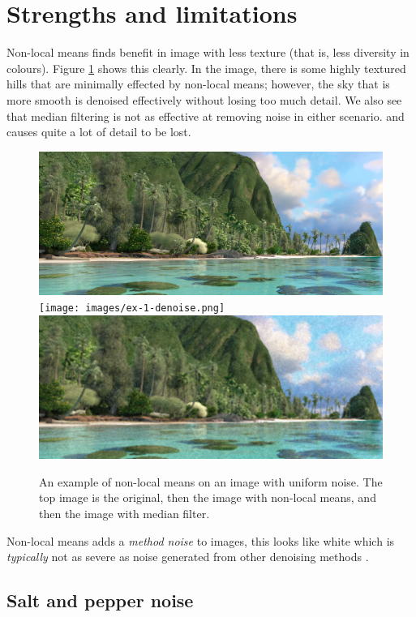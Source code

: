 \section{Strengths and limitations}

Non-local means finds benefit in image with less texture
(that is, less diversity in colours).
Figure \ref{fig:ex-1} shows this clearly.
In the image, 
there is some highly textured hills that are minimally effected by
non-local means; however,
the sky that is more smooth is denoised effectively without losing too much detail.
We also see that median filtering is not as effective at removing noise in 
either scenario. and causes quite a lot of detail to be lost.

\begin{figure}
    \centering
    \includegraphics[width=0.7\linewidth]{images/ex-1-original.jpg}
    \texttt{[image: images/ex-1-denoise.png]}
    \includegraphics[width=0.7\linewidth]{images/ex-1-median.png}
    \caption{An example of non-local means on an image with uniform noise.
             The top image is the original, 
             then the image with non-local means, 
             and then the image with median filter.}
    \label{fig:ex-1}
\end{figure}

Non-local means adds a \emph{method noise} to images,
this looks like white which is \emph{typically} not as severe
as noise generated from other denoising methods \cite{buades2004image}.

\subsection{Salt and pepper noise}


